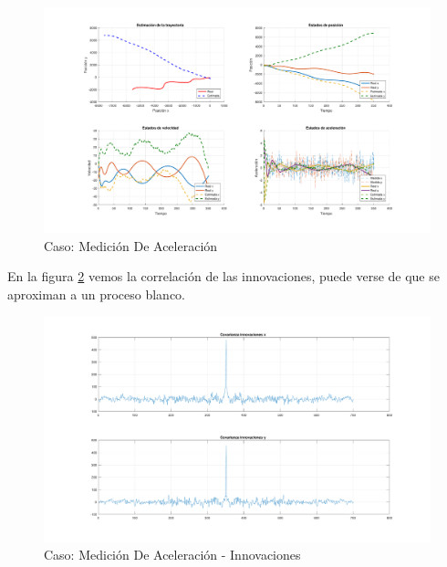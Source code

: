 		\begin{figure}[H]
			\centering
			\includegraphics[width=1.0\textwidth,keepaspectratio]{Figuras/graf_ej2c.pdf}
			\caption{Caso: Medición De Aceleración}
			\label{fig:ej2c}
		\end{figure}
		
		En la figura \ref{fig:ej2c_innov} vemos la correlación de las innovaciones, puede verse de que se aproximan a un proceso blanco.
		
		\begin{figure}[H]
			\centering
			\includegraphics[width=1.0\textwidth,keepaspectratio]{Figuras/covinn_ej2c.pdf}
			\caption{Caso: Medición De Aceleración - Innovaciones}
			\label{fig:ej2c_innov}
		\end{figure}


